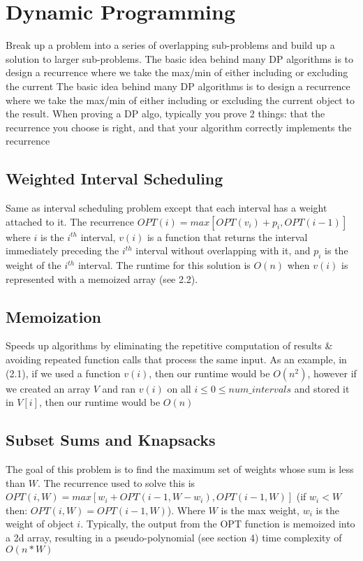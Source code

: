 \documentclass{article}
\begin{document}
\section{Dynamic Programming}
Break up a problem into a series of overlapping sub-problems and build up a solution to larger sub-problems.
The basic idea behind many DP algorithms is to design a recurrence where we take the max/min of either including or excluding the current
The basic idea behind many DP algorithms is to design a recurrence where we take the max/min of either including or excluding the current
object to the result. When proving a DP algo, typically you prove 2 things: that the recurrence you choose is right, and 
that your algorithm correctly implements the recurrence

\subsection{Weighted Interval Scheduling}
Same as interval scheduling problem except that each interval has a weight attached to it. 
The recurrence $OPT(i) = max[OPT(v_i) + p_i, OPT(i - 1)]$ where $i$ is the $i^{th}$ interval, $v(i)$
is a function that returns the interval immediately preceding the $i^{th}$ interval without overlapping with it, 
and $p_i$ is the weight of the $i^{th}$ interval. The runtime for this solution is $O(n)$ when $v(i)$ is 
represented with a memoized array (see 2.2).

\subsection{Memoization}
Speeds up algorithms by eliminating the repetitive computation of results \& avoiding repeated function calls that process the same input.
As an example, in (2.1), if we used a function $v(i)$, then our runtime would be $O(n^2)$, however if we created an array $V$ and ran $v(i)$
on all $i \leq 0 \leq num\_intervals$  and stored it in $V[i]$, then our runtime would be $O(n)$

\subsection{Subset Sums and Knapsacks}
The goal of this problem is to find the maximum set of weights whose sum is less than $W$.
The recurrence used to solve this is $OPT(i, W) = max[w_i + OPT(i - 1, W - w_i), OPT(i-1, W)]$ (if $w_i < W$ then: $OPT(i, W) = OPT(i-1, W)$).
Where $W$ is the max weight, $w_i$ is the weight of object $i$. Typically, the output from the OPT 
function is memoized into a 2d array, resulting in a pseudo-polynomial (see section 4) time complexity of $O(n * W)$
\vspace{10em}
\end{document}
